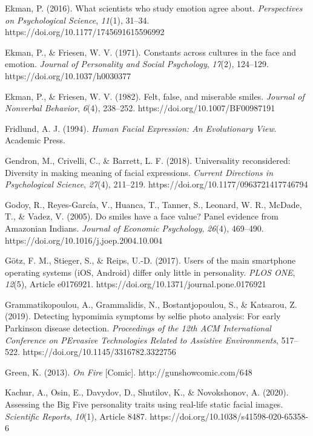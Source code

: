 \documentclass[authordate, empirical]{jote-new-article}
\begin{document}
Ekman, P. (2016). What scientists who study emotion agree about. \emph{Perspectives on Psychological Science}, \emph{11}(1), 31--34. https://doi.org/10.1177/1745691615596992



Ekman, P., \& Friesen, W. V. (1971). Constants across cultures in the face and emotion. \emph{Journal of Personality and Social Psychology}, \emph{17}(2), 124--129. https://doi.org/10.1037/h0030377



Ekman, P., \& Friesen, W. V. (1982). Felt, false, and miserable smiles. \emph{Journal of Nonverbal Behavior}, \emph{6}(4), 238--252. https://doi.org/10.1007/BF00987191



Fridlund, A. J. (1994). \emph{Human Facial Expression: An Evolutionary View}. Academic Press.



Gendron, M., Crivelli, C., \& Barrett, L. F. (2018). Universality reconsidered: Diversity in making meaning of facial expressions. \emph{Current Directions in Psychological Science}, \emph{27}(4), 211--219. https://doi.org/10.1177/0963721417746794



Godoy, R., Reyes-García, V., Huanca, T., Tanner, S., Leonard, W. R., McDade, T., \& Vadez, V. (2005). Do smiles have a face value? Panel evidence from Amazonian Indians. \emph{Journal of Economic Psychology}, \emph{26}(4), 469--490. https://doi.org/10.1016/j.joep.2004.10.004



Götz, F. M., Stieger, S., \& Reips, U.-D. (2017). Users of the main smartphone operating systems (iOS, Android) differ only little in personality. \emph{PLOS ONE}, \emph{12}(5), Article e0176921. https://doi.org/10.1371/journal.pone.0176921



Grammatikopoulou, A., Grammalidis, N., Bostantjopoulou, S., \& Katsarou, Z. (2019). Detecting hypomimia symptoms by selfie photo analysis: For early Parkinson disease detection. \emph{Proceedings of the 12th ACM International Conference on }\emph{PErvasive}\emph{ Technologies Related to Assistive Environments}, 517--522. https://doi.org/10.1145/3316782.3322756



Green, K. (2013). \emph{On Fire} [Comic]. http://gunshowcomic.com/648



Kachur, A., Osin, E., Davydov, D., Shutilov, K., \& Novokshonov, A. (2020). Assessing the Big Five personality traits using real-life static facial images. \emph{Scientific Reports}, \emph{10}(1), Article 8487. https://doi.org/10.1038/s41598-020-65358-6
\end{document}
